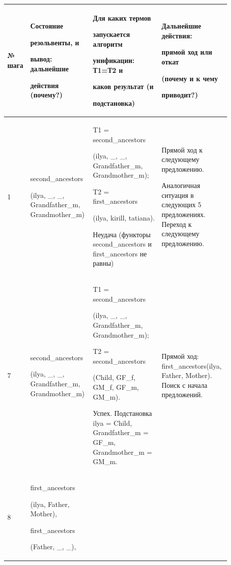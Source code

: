 \documentclass[a4paper,12pt]{article}
\begin{document}
	\begin{center}
		\begin{longtable}[h!]{|p{0.05\linewidth}|p{0.25\linewidth}|p{ 0.3\linewidth}|p{ 0.3\linewidth}|}
			\hline
			{№ шага} & {Состояние 
				
				резольвенты, и 
				
				вывод: дальнейшие 
				
				действия (почему?)} & {Для каких термов 
				
				запускается алгоритм 
				
				унификации: Т1=Т2 и 
				
				каков {\bf результат} (и 
				
				подстановка)} & {Дальнейшие действия: 
				
				прямой ход или откат 
				
				(почему и к чему 
				
				приводит?)}\\
			\hline
			{1} & {second\_ancestors
				
				(ilya, \_, \_, Grandfather\_m, Grandmother\_m)} & {T1 = second\_ancestors
				
				(ilya, \_, \_, Grandfather\_m, Grandmother\_m);
			
		T2 = first\_ancestors
		
		(ilya, kirill, tatiana).
	
Неудача (функторы second\_ancestors и first\_ancestors не равны)} & {Прямой ход к следующему предложению.

Аналогичная ситуация в следующих 5 предложениях. Переход к следующему предложению.}\\
			\hline
			{7} & {second\_ancestors
				
				(ilya, \_, \_, Grandfather\_m, Grandmother\_m)} & {T1 = second\_ancestors
				
				(ilya, \_, \_, Grandfather\_m, Grandmother\_m);
			
		T2 = second\_ancestors
		
		(Child, GF\_f, GM\_f, GF\_m, GM\_m).
	
Успех. Подстановка ilya = Child, Grandfather\_m = GF\_m, Grandmother\_m = GM\_m.} & {Прямой ход: first\_ancestors(ilya, Father, Mother). Поиск с начала предложений.}\\
			\hline
			{8} & {first\_ancestors
				
				(ilya, Father, Mother),
			
		first\_ancestors
	
(Father, \_, \_),

}
\end{longtable}
\end{center}
\end{document}
